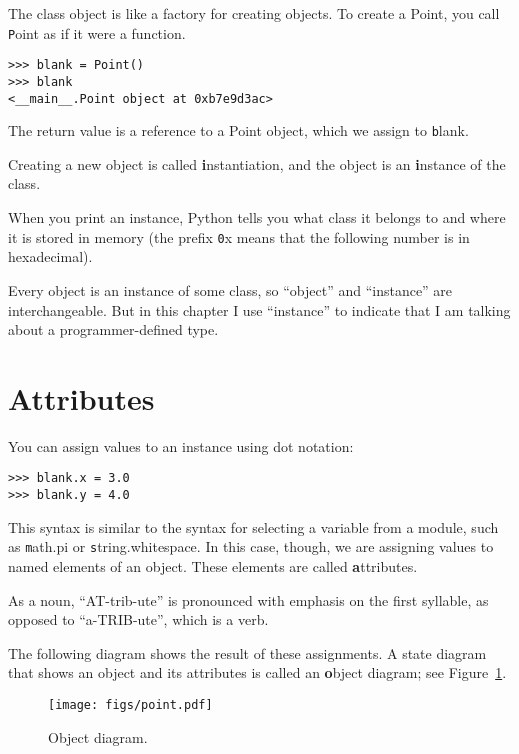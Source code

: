 \documentclass[
DIV=11,
fontsize=13,
twoside,
headinclude=false,
titlepage=firstiscover,
abstract=true,
headsepline=true,
footsepline=true,
chapterprefix=true, %
headings=big,
bibliography=totoc,%
captions=tableheading
]{scrbook}
\theoremstyle{definition}
\begin{document}
The class object is like a factory for creating objects.  To create a
Point, you call {\texttt Point} as if it were a function.

\begin{lstlisting}
>>> blank = Point()
>>> blank
<__main__.Point object at 0xb7e9d3ac>
\end{lstlisting}
%
The return value is a reference to a Point object, which we
assign to {\texttt blank}.  

Creating a new object is called
{\textbf instantiation}, and the object is an {\textbf instance} of
the class.

When you print an instance, Python tells you what class it
belongs to and where it is stored in memory (the prefix
{\texttt 0x} means that the following number is in hexadecimal).

Every object is an instance of some class, so ``object'' and
``instance'' are interchangeable.  But in this chapter I use
``instance'' to indicate that I am talking about a programmer-defined
type.


\section{Attributes}
\label{attributes}

You can assign values to an instance using dot notation:

\begin{lstlisting}
>>> blank.x = 3.0
>>> blank.y = 4.0
\end{lstlisting}
%
This syntax is similar to the syntax for selecting a variable from a
module, such as {\texttt math.pi} or {\texttt string.whitespace}.  In this case,
though, we are assigning values to named elements of an object.
These elements are called {\textbf attributes}.

As a noun, ``AT-trib-ute'' is pronounced with emphasis on the first
syllable, as opposed to ``a-TRIB-ute'', which is a verb.

The following diagram shows the result of these assignments.
A state diagram that shows an object and its attributes is
called an {\textbf object diagram}; see Figure~\ref{fig.point}.

\begin{figure}
\centerline
{\texttt{[image: figs/point.pdf]}}
\caption{Object diagram.}
\label{fig.point}
\end{figure}
\end{document}
